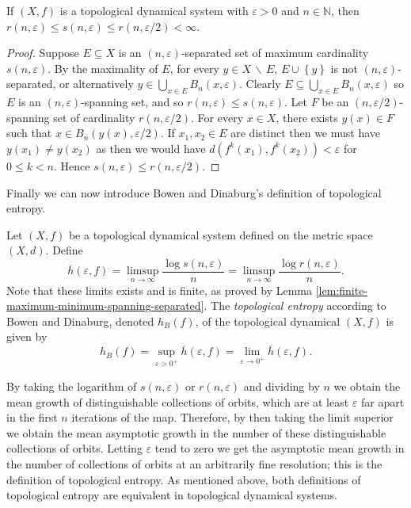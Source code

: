 \begin{lem} \label{lem:finite-maximum-minimum-spanning-separated}
    If $(X, f)$ is a topological dynamical system with $\varepsilon > 0$ and $n \in \mathbb{N}$, then $r(n, \varepsilon) \leq s(n, \varepsilon) \leq r(n, \varepsilon / 2) < \infty$.
    \begin{proof}
        Suppose $E \subseteq X$ is an $(n, \varepsilon)$-separated set of maximum cardinality $s(n, \varepsilon)$. By the maximality of $E$, for every $y \in X\, \backslash \, E$, $E \cup \left\lbrace y \right\rbrace$ is not $(n, \varepsilon)$-separated, or alternatively $y \in \bigcup_{x \in E}B_n(x, \varepsilon)$. Clearly $E \subseteq \bigcup_{x \in E}B_n(x, \varepsilon)$ so $E$ is an $(n, \varepsilon)$-spanning set, and so $r(n, \varepsilon) \leq s(n, \varepsilon)$. Let $F$ be an $(n, \varepsilon / 2)$-spanning set of cardinality $r(n, \varepsilon / 2)$. For every $x \in X$, there exists $y(x) \in F$ such that $x \in B_n(y(x), \varepsilon / 2)$. If $x_1, x_2 \in E$ are distinct then we must have $y(x_1) \neq y(x_2)$ as then we would have $d(f^k(x_1), f^k(x_2)) < \varepsilon$ for $0 \leq k < n$. Hence $s(n, \varepsilon) \leq r(n, \varepsilon / 2)$.
    \end{proof}
\end{lem}

Finally we can now introduce Bowen and Dinaburg's definition of topological entropy.

\begin{defn}
    Let $(X, f)$ be a topological dynamical system defined on the metric space $(X, d)$. Define \[\overline{h}(\varepsilon, f) = \limsup_{n \to \infty}\frac{\log{s(n, \varepsilon)}}{n} = \limsup_{n \to \infty} \frac{\log{r(n, \varepsilon)}}{n}.\] Note that these limits exists and is finite, as proved by Lemma \ref{lem:finite-maximum-minimum-spanning-separated}. The \emph{topological entropy} according to Bowen and Dinaburg, denoted $h_B(f)$, of the topological dynamical $(X, f)$ is given by \[h_B(f) = \sup_{\varepsilon > 0^+}\overline{h}(\varepsilon, f) = \lim_{\varepsilon \to 0^+}\overline{h}(\varepsilon, f).\]
\end{defn}

By taking the logarithm of $s(n, \varepsilon)$ or $r(n, \varepsilon)$ and dividing by $n$ we obtain the mean growth of distinguishable collections of orbits, which are at least $\varepsilon$ far apart in the first $n$ iterations of the map. Therefore, by then taking the limit superior we obtain the mean asymptotic growth in the number of these distinguishable collections of orbits. Letting $\varepsilon$ tend to zero we get the asymptotic mean growth in the number of collections of orbits at an arbitrarily fine resolution; this is the definition of topological entropy. As mentioned above, both definitions of topological entropy are equivalent in topological dynamical systems.

